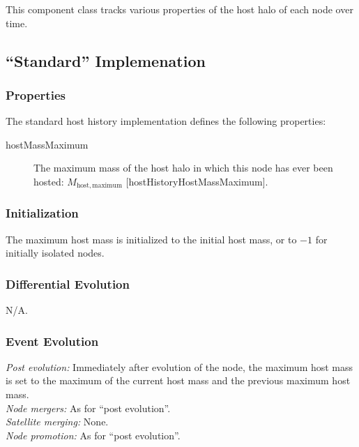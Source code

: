 This component class tracks various properties of the host halo of each \gls{node} over time.

\subsection{``Standard'' Implemenation}

\subsubsection{Properties}

The standard host history implementation defines the following properties:
\begin{description}
 \item [{\normalfont \ttfamily hostMassMaximum}] The maximum mass of the host halo in which this node has ever been hosted: $M_\mathrm{host, maximum}$ [{\normalfont \ttfamily hostHistoryHostMassMaximum}].
\end{description}

\subsubsection{Initialization}

The maximum host mass is initialized to the initial host mass, or to $-1$ for initially isolated nodes.

\subsubsection{Differential Evolution}

N/A.

\subsubsection{Event Evolution}

\noindent\emph{Post evolution:} Immediately after evolution of the node, the maximum host mass is set to the maximum of the current host mass and the previous maximum host mass.\\

\noindent\emph{Node mergers:} As for ``post evolution''.\\

\noindent\emph{Satellite merging:} None.\\

\noindent\emph{Node promotion:} As for ``post evolution''.\\

